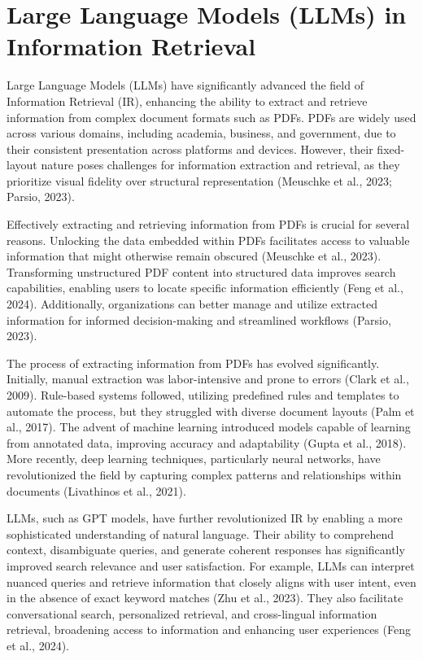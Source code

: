 

\section{Large Language Models (LLMs) in Information Retrieval}

\noindent Large Language Models (LLMs) have significantly advanced the field of Information Retrieval (IR), enhancing the ability to extract and retrieve information from complex document formats such as PDFs. PDFs are widely used across various domains, including academia, business, and government, due to their consistent presentation across platforms and devices. However, their fixed-layout nature poses challenges for information extraction and retrieval, as they prioritize visual fidelity over structural representation (Meuschke et al., 2023; Parsio, 2023).

Effectively extracting and retrieving information from PDFs is crucial for several reasons. Unlocking the data embedded within PDFs facilitates access to valuable information that might otherwise remain obscured (Meuschke et al., 2023). Transforming unstructured PDF content into structured data improves search capabilities, enabling users to locate specific information efficiently (Feng et al., 2024). Additionally, organizations can better manage and utilize extracted information for informed decision-making and streamlined workflows (Parsio, 2023).

The process of extracting information from PDFs has evolved significantly. Initially, manual extraction was labor-intensive and prone to errors (Clark et al., 2009). Rule-based systems followed, utilizing predefined rules and templates to automate the process, but they struggled with diverse document layouts (Palm et al., 2017). The advent of machine learning introduced models capable of learning from annotated data, improving accuracy and adaptability (Gupta et al., 2018). More recently, deep learning techniques, particularly neural networks, have revolutionized the field by capturing complex patterns and relationships within documents (Livathinos et al., 2021).

LLMs, such as GPT models, have further revolutionized IR by enabling a more sophisticated understanding of natural language. Their ability to comprehend context, disambiguate queries, and generate coherent responses has significantly improved search relevance and user satisfaction. For example, LLMs can interpret nuanced queries and retrieve information that closely aligns with user intent, even in the absence of exact keyword matches (Zhu et al., 2023). They also facilitate conversational search, personalized retrieval, and cross-lingual information retrieval, broadening access to information and enhancing user experiences (Feng et al., 2024).

